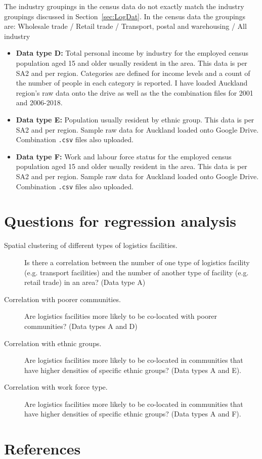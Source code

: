 \documentclass[3p, a4paper, authoryear, 11pt, fleqn, review]{elsarticle}
\newcommand{\nmt}[1]{{\color{Maroon}{~(nmt: #1)}}}
\begin{document}
The industry groupings in the census data do not exactly match the industry groupings discussed in Section~\ref{sec:LogDat}. In the census data the groupings are: Wholesale trade / Retail trade / Transport, postal and warehousing / All industry

\begin{itemize}
\item \textbf{Data type D:} Total personal income by industry for the employed census population aged 15 and older usually resident in the area. This data is per \ac{SA2} and per region. Categories are defined for income levels and a count of the number of people in each category is reported. I have loaded Auckland region's raw data onto the drive as well as the the combination files for 2001 and 2006-2018. \nmt{In hindsight, I think household income would be a better variable than personal income when measuring the poverty or affluence of a community. What do you think? This data is available, just needs to be downloaded.}
\item \textbf{Data type E:} Population usually resident by ethnic group. This data is per \ac{SA2} and per region. Sample raw data for Auckland loaded onto Google Drive. Combination \texttt{.csv} files also uploaded.  
\item \textbf{Data type F:} Work and labour force status for the employed census population aged 15 and older usually resident in the area. This data is per \ac{SA2} and per region. Sample raw data for Auckland loaded onto Google Drive. Combination \texttt{.csv} files also uploaded.
\end{itemize}

\section{Questions for regression analysis}

\begin{description}
\item[Spatial clustering of different types of logistics facilities.] Is there a correlation between the number of one type of logistics facility (e.g. transport facilities) and the number of another type of facility (e.g. retail trade) in an area? (Data type A)
\item[Correlation with poorer communities.] Are logistics facilities more likely to be co-located with poorer communities? (Data types A and D)
\item[Correlation with ethnic groups.] Are logistics facilities more likely to be co-located in communities that have higher densities of specific ethnic groups? (Data types A and E). \nmt{Keeping in mind that certain ethnic groups in New Zealand may be statistically ``poorer", so this may have to be combined with the previous bullet.} 
\item[Correlation with work force type.] Are logistics facilities more likely to be co-located in communities that have higher densities of specific ethnic groups? (Data types A and F). \nmt{This could also be related to the previous two bullets.}
\end{description}



\section*{References}

\end{document}
